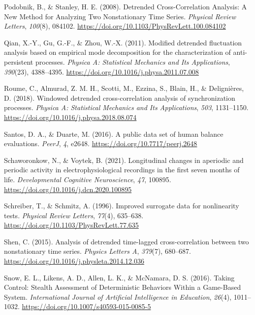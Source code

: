 \documentclass[
  man]{apa6}
\newlength{\cslhangindent}
\newlength{\cslentryspacingunit} %
\newenvironment{CSLReferences}[2] %
 {%
  \setlength{\parindent}{0pt}
  \ifodd #1
  \let\oldpar\par
  \def\par{\hangindent=\cslhangindent\oldpar}
  \fi
  \setlength{\parskip}{#2\cslentryspacingunit}
 }%
 {}
\begin{document}
\begin{CSLReferences}{1}{0}
\leavevmode{}%
Podobnik, B., \& Stanley, H. E. (2008). Detrended {Cross}-{Correlation} {Analysis}: {A} {New} {Method} for {Analyzing} {Two} {Nonstationary} {Time} {Series}. \emph{Physical Review Letters}, \emph{100}(8), 084102. \url{https://doi.org/10.1103/PhysRevLett.100.084102}

\leavevmode{}%
Qian, X.-Y., Gu, G.-F., \& Zhou, W.-X. (2011). Modified detrended fluctuation analysis based on empirical mode decomposition for the characterization of anti-persistent processes. \emph{Physica A: Statistical Mechanics and Its Applications}, \emph{390}(23), 4388--4395. \url{https://doi.org/10.1016/j.physa.2011.07.008}

\leavevmode{}%
Roume, C., Almurad, Z. M. H., Scotti, M., Ezzina, S., Blain, H., \& Delignières, D. (2018). Windowed detrended cross-correlation analysis of synchronization processes. \emph{Physica A: Statistical Mechanics and Its Applications}, \emph{503}, 1131--1150. \url{https://doi.org/10.1016/j.physa.2018.08.074}

\leavevmode{}%
Santos, D. A., \& Duarte, M. (2016). A public data set of human balance evaluations. \emph{PeerJ}, \emph{4}, e2648. \url{https://doi.org/10.7717/peerj.2648}

\leavevmode{}%
Schaworonkow, N., \& Voytek, B. (2021). Longitudinal changes in aperiodic and periodic activity in electrophysiological recordings in the first seven months of life. \emph{Developmental Cognitive Neuroscience}, \emph{47}, 100895. \url{https://doi.org/10.1016/j.dcn.2020.100895}

\leavevmode{}%
Schreiber, T., \& Schmitz, A. (1996). Improved surrogate data for nonlinearity tests. \emph{Physical Review Letters}, \emph{77}(4), 635--638. \url{https://doi.org/10.1103/PhysRevLett.77.635}

\leavevmode{}%
Shen, C. (2015). Analysis of detrended time-lagged cross-correlation between two nonstationary time series. \emph{Physics Letters A}, \emph{379}(7), 680--687. \url{https://doi.org/10.1016/j.physleta.2014.12.036}

\leavevmode{}%
Snow, E. L., Likens, A. D., Allen, L. K., \& McNamara, D. S. (2016). Taking Control: Stealth Assessment of Deterministic Behaviors Within a Game-Based System. \emph{International Journal of Artificial Intelligence in Education}, \emph{26}(4), 1011--1032. \url{https://doi.org/10.1007/s40593-015-0085-5}


\end{CSLReferences}
\end{document}
